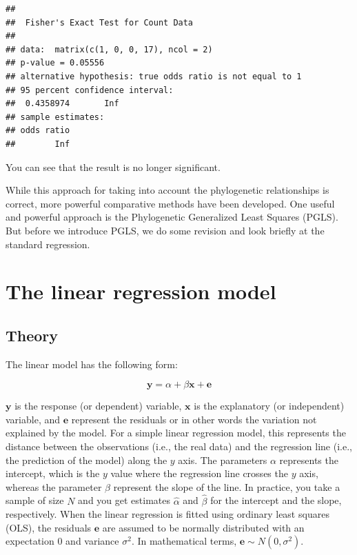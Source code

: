 \documentclass[
]{book}
\begin{document}
\begin{verbatim}
## 
##  Fisher's Exact Test for Count Data
## 
## data:  matrix(c(1, 0, 0, 17), ncol = 2)
## p-value = 0.05556
## alternative hypothesis: true odds ratio is not equal to 1
## 95 percent confidence interval:
##  0.4358974       Inf
## sample estimates:
## odds ratio 
##        Inf
\end{verbatim}

You can see that the result is no longer significant.

While this approach for taking into account the phylogenetic relationships is correct, more powerful comparative methods have been developed. One useful and powerful approach is the Phylogenetic Generalized Least Squares (PGLS). But before we introduce PGLS, we do some revision and look briefly at the standard regression.

\chapter{The linear regression model}\label{linear-regression}

\section{Theory}\label{theory}

The linear model has the following form:

\[\textbf{y} = \alpha + \beta \textbf{x} + \textbf{e}\]

\(\textbf{y}\) is the response (or dependent) variable, \(\textbf{x}\) is the explanatory (or independent) variable, and \(\textbf{e}\) represent the residuals or in other words the variation not explained by the model. For a simple linear regression model, this represents the distance between the observations (i.e., the real data) and the regression line (i.e., the prediction of the model) along the \(y\) axis. The parameters \(\alpha\) represents the intercept, which is the \(y\) value where the regression line crosses the \(y\) axis, whereas the parameter \(\beta\) represent the slope of the line. In practice, you take a sample of size \(N\) and you get estimates \(\hat{\alpha}\) and \(\hat{\beta}\) for the intercept and the slope, respectively. When the linear regression is fitted using ordinary least squares (OLS), the residuals \(\textbf{e}\) are assumed to be normally distributed with an expectation \(0\) and variance \(\sigma^2\). In mathematical terms, \(\textbf{e} \sim N(0,\sigma^2)\).
\end{document}
